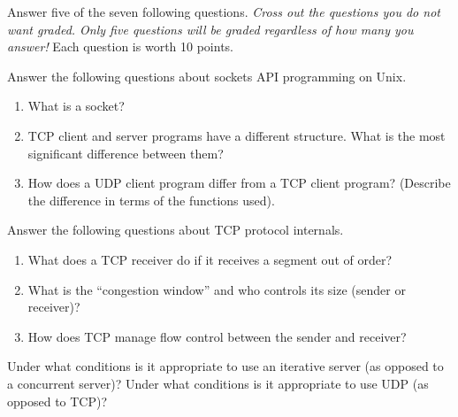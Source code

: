 \documentclass[12pt]{examdesign}
\begin{document}
\begin{shortanswer}[title={Short Answer}]
  
  Answer five of the seven following questions. \emph{Cross out the questions you do not want graded. Only five questions will be graded regardless of how many you answer!} Each question is worth 10 points.

  \begin{question}
    Answer the following questions about sockets API programming on Unix.
    \begin{enumerate}
      \item What is a socket?
      \item TCP client and server programs have a different structure. What is the most significant difference between them?
      \item How does a UDP client program differ from a TCP client program? (Describe the difference in terms of the functions used).
    \end{enumerate}

    \begin{answer}
    \end{answer}
    \pagebreak
  \end{question}

  \begin{question}
    Answer the following questions about TCP protocol internals.
    \begin{enumerate}
      \item What does a TCP receiver do if it receives a segment out of order?
      \item What is the ``congestion window'' and who controls its size (sender or receiver)?
      \item How does TCP manage flow control between the sender and receiver?
    \end{enumerate}
    
    \begin{answer}
    \end{answer}
    \pagebreak
  \end{question}

  \begin{question}
    Under what conditions is it appropriate to use an iterative server (as opposed to a concurrent server)? Under what conditions is it appropriate to use UDP (as opposed to TCP)?
    \begin{answer}
    \end{answer}
    \pagebreak
  \end{question}


\end{shortanswer}
\end{document}
